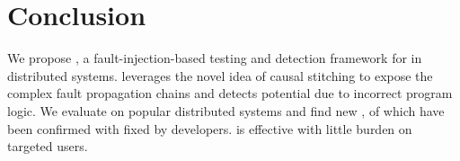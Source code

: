 \section{Conclusion}


We propose \tool, a fault-injection-based testing and detection framework for \vcs in distributed systems. \tool leverages the novel idea of causal stitching to expose the complex fault propagation chains and detects potential \vcs due to incorrect program logic. We evaluate \tool on \NumOfSysTested popular distributed systems and find \NumOfNewVC new \vcs, \NumOfConfirmedVC of which have been confirmed with \NumOfFixedVC fixed by developers. \tool is effective with little burden on targeted users. 
